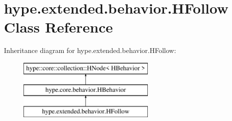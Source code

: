 \hypertarget{classhype_1_1extended_1_1behavior_1_1_h_follow}{\section{hype.\-extended.\-behavior.\-H\-Follow Class Reference}
\label{classhype_1_1extended_1_1behavior_1_1_h_follow}
}
Inheritance diagram for hype.\-extended.\-behavior.\-H\-Follow\-:\begin{figure}[H]
\begin{center}
\leavevmode
\includegraphics[height=3.000000cm]{classhype_1_1extended_1_1behavior_1_1_h_follow}
\end{center}
\end{figure}
